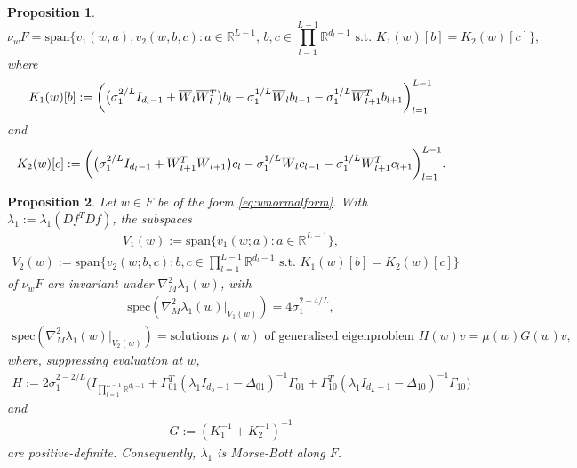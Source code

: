 \documentclass[10pt,a4paper]{amsart}
\newtheorem{proposition}{Proposition}
\newcommand{\RB}{\mathbb{R}}
\newcommand{\bW}{\smash{\overline{W}}\vphantom{W}}
\begin{document}
\begin{proposition}
    \begin{equation}
        \nu_wF = \mathrm{span}\bigg\{v_1(w,a),v_2(w,b,c):a\in\RB^{L-1},\,b,c\in\prod_{l=1}^{L-1}\RB^{d_l-1}\text{ s.t. }K_1(w)[b] = K_2(w)[c]\bigg\},
    \end{equation}
    where
    \begin{equation}
        K_1(w)[b]:=\bigg(\big(\sigma_1^{2/L}I_{d_l-1}+\bW_l\bW_l^T\big)b_l - \sigma_1^{1/L}\bW_lb_{l-1} - \sigma_1^{1/L}\bW_{l+1}^Tb_{l+1}\bigg)_{l=1}^{L-1}
    \end{equation}
    and
    \begin{equation}
        K_2(w)[c]:=\bigg(\big(\sigma_1^{2/L}I_{d_l-1}+\bW_{l+1}^T\bW_{l+1}\big)c_l-\sigma_1^{1/L}\bW_lc_{l-1}-\sigma_1^{1/L}\bW_{l+1}^Tc_{l+1}\bigg)_{l=1}^{L-1}.
    \end{equation}
\end{proposition}

\begin{proposition}\label{prop:morsebott}
    Let $w\in F$ be of the form \eqref{eq:wnormalform}. With $\lambda_1:=\lambda_1(Df^TDf)$, the subspaces
    \begin{align}
    V_1(w):=\mathrm{span}\bigg\{v_1(w;a):a\in\RB^{L-1}\bigg\},
    \end{align}
    \begin{align}
    V_2(w):=\mathrm{span}\bigg\{v_2(w;b,c):b,c\in\prod_{l=1}^{L-1}\RB^{d_l-1}\text{ s.t. }K_1(w)[b] = K_2(w)[c]\bigg\}
    \end{align}
    of $\nu_wF$ are invariant under $\nabla^2_M\lambda_1(w)$, with
    \begin{align}
    \mathrm{spec}(\nabla^2_M\lambda_1(w)|_{V_1(w)}) = 4\sigma_1^{2-4/L},
    \end{align}
    \begin{align}
    \mathrm{spec}(\nabla^2_M\lambda_1(w)|_{V_2(w)}) = \text{solutions $\mu(w)$ of generalised eigenproblem }H(w)v = \mu(w) G(w)v,
    \end{align}
    where, suppressing evaluation at $w$,
    \begin{align}
    H:=2\sigma_1^{2-2/L}\big(I_{\prod_{l=1}^{L-1}\RB^{d_l-1}} + \Gamma_{01}^T(\lambda_1I_{d_0-1}-\Delta_{01})^{-1}\Gamma_{01} + \Gamma_{10}^T(\lambda_1I_{d_L-1}-\Delta_{10})^{-1}\Gamma_{10}\big)
    \end{align}
    and
    \begin{align}
    G:=(K_1^{-1}+K_2^{-1})^{-1}
    \end{align}
    are positive-definite. Consequently, $\lambda_1$ is Morse-Bott along $F$.
\end{proposition}
\end{document}
